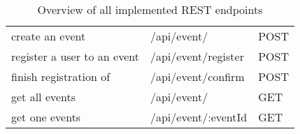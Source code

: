 \begin{table}
\begin{tabular}{ |l|l|l| }
        create an event                & /api/event/                      & POST           \\
        register a user to an event    & /api/event/register              & POST           \\
        finish registration of         & /api/event/confirm               & POST           \\
        get all events                 & /api/event/                      & GET            \\
        get one events                 & /api/event/:eventId              & GET            \\
        \hline
    \end{tabular}
    \caption{Overview of all implemented REST endpoints} \label{chp:appendix:implementedRest}
\end{table}


